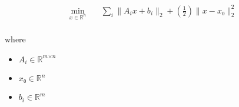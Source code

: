 \documentclass[12pt]{article}
\begin{document}
\[
\begin{aligned} \min_{\textit{x} \in \mathbb{R}^{ \textit{n}}} \quad & \sum_\textit{i} \|\textit{A}_{ \textit{i} }\textit{x} + \textit{b}_{ \textit{i} }\|_2 + (\frac{1}{2})\|\textit{x} - \textit{x₀}\|_2^{2} \\
\end{aligned}
\]

where
\begin{itemize}
\item $\textit{A}_{\textit{i}} \in \mathbb{R}^{ \textit{m} \times \textit{n} }$
\item $\textit{x₀} \in \mathbb{R}^{ \textit{n}}$
\item $\textit{b}_{\textit{i}} \in \mathbb{R}^{ \textit{m}}$
\end{itemize}
\end{document}
